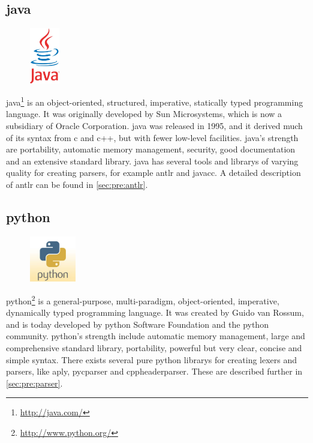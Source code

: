 \subsection{\Gls{java}}
\label{sec:pre:java}
\begin{figure}
	\vspace{-30pt}
	\includegraphics[width=1.3cm]{./planning/img/java_logo}
	\vspace{-30pt}
\end{figure}
\Gls{java}\footnote{\url{http://java.com/}} is an object-oriented, structured,
imperative, statically typed programming language. It was originally developed
by Sun Microsystems, which is now a subsidiary of Oracle Corporation. \Gls{java} was
released in 1995, and it derived much of its syntax from \Gls{c} and \Gls{c++}, but with
fewer low-level facilities. \Gls{java}’s strength are portability, automatic memory
management, security, good documentation and an extensive standard \gls{library}.\cite{JavaCOM}
\Gls{java} has several tools and \glspl{library} of varying quality for creating \glspl{parser},
for example \gls{antlr} and \gls{javacc}. A detailed description of \gls{antlr} can be found in 
\autoref{sec:pre:antlr}.

\subsection{python}
\label{sec:pre:python}
\begin{figure}
	\vspace{-20pt}
	\includegraphics[width=2cm]{./planning/img/python_logo}
	\vspace{-20pt}
\end{figure}
\Gls{python}\footnote{\url{http://www.python.org/}} is a general-purpose,
multi-paradigm, object-oriented, imperative, dynamically typed programming
language. It was created by Guido van Rossum, and is today developed by \Gls{python}
Software Foundation and the \Gls{python} community. \Gls{python}’s strength include
automatic memory management, large and comprehensive standard \gls{library},
portability, powerful but very clear, concise and simple syntax.\cite{PythonORG} There exists
several pure \Gls{python} \glspl{library} for creating \glspl{lexer} and \glspl{parser}, like \gls{aply},
\gls{pycparser} and cppheaderparser. These are described further in
\autoref{sec:pre:parser}.


